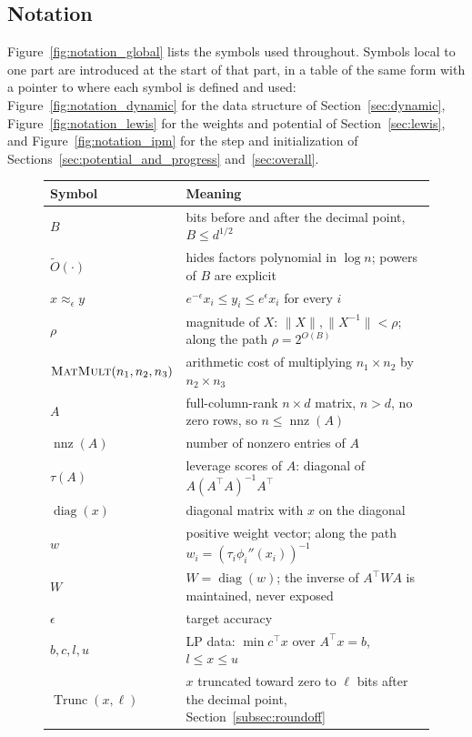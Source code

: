 \documentclass[11pt]{article}
\newcommand{\Trunc}{\operatorname{Trunc}}
\newcommand{\diag}{\operatorname{diag}}
\newcommand{\nnz}{\operatorname{nnz}}
\newcommand{\MM}{\textsc{MatMult}}
\renewcommand{\O}{\widetilde O}
\begin{document}
\subsection{Notation}
\label{subsec:notation}

Figure~\ref{fig:notation_global} lists the symbols used throughout.
Symbols local to one part are introduced at the start of that part, in a table
of the same form with a pointer to where each symbol is defined and used:
Figure~\ref{fig:notation_dynamic} for the data structure of
Section~\ref{sec:dynamic}, Figure~\ref{fig:notation_lewis} for the weights and
potential of Section~\ref{sec:lewis}, and Figure~\ref{fig:notation_ipm} for the
step and initialization of Sections~\ref{sec:potential_and_progress}
and~\ref{sec:overall}.

\begin{figure}[H]
\begin{center}
\begin{tabular}{@{}ll@{}}
\toprule
Symbol & Meaning \\
\midrule
$B$ & bits before and after the decimal point, $B \le d^{1/2}$ \\
$\O(\cdot)$ & hides factors polynomial in $\log n$; powers of $B$ are explicit \\
$x\approx_\epsilon y$ & $e^{-\epsilon}x_i\le y_i\le e^{\epsilon}x_i$ for every $i$ \\
$\rho$ & magnitude of $X$: $\|X\|,\|X^{-1}\|<\rho$; along the path $\rho=2^{O(B)}$ \\
$\MM(n_1,n_2,n_3)$ & arithmetic cost of multiplying $n_1\times n_2$ by $n_2\times n_3$ \\
$A$ & full-column-rank $n\times d$ matrix, $n>d$, no zero rows, so $n\le\nnz(A)$ \\
$\nnz(A)$ & number of nonzero entries of $A$ \\
$\tau(A)$ & leverage scores of $A$: diagonal of $A(A^\top A)^{-1}A^\top$ \\
$\diag(x)$ & diagonal matrix with $x$ on the diagonal \\
$w$ & positive weight vector; along the path $w_i=(\tau_i\phi_i''(x_i))^{-1}$ \\
$W$ & $W=\diag(w)$; the inverse of $A^\top WA$ is maintained, never exposed \\
$\epsilon$ & target accuracy \\
$b,c,l,u$ & LP data: $\min c^\top x$ over $A^\top x = b$, $l \le x \le u$ \\
$\Trunc(x, \ell)$ & $x$ truncated toward zero to $\ell$ bits after the decimal point, Section~\ref{subsec:roundoff} \\

\end{tabular}
\end{center}
\end{figure}
\end{document}
